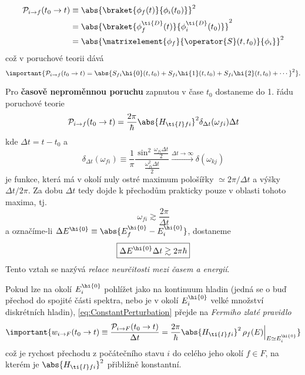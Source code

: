 \begin{align}
    \mathcal{P}_{i\rightarrow f}(t_{0}\rightarrow t)
        &\equiv\abs{\braket{\phi_{f}(t)}{\phi_{i}(t_{0})}}^{2}\nonumber\\
        &=\abs{\braket{\phi_{f}^{\ti{D}}(t)}{\phi_{i}^{\ti{D}}(t_{0})}}^{2}\nonumber\\
        &=\abs{\matrixelement{\phi_{f}}{\operator{S}(t,t_{0})}{\phi_{i}}}^{2}
\end{align}
což v poruchové teorii dává
\begin{equation}
    \important{
        \mathcal{P}_{i\rightarrow f}(t_{0}\rightarrow t)
            =\abs{S_{fi}\hi{0}(t,t_{0})+S_{fi}\hi{1}(t,t_{0})
                +S_{fi}\hi{2}(t,t_{0})+\dotsb}^{2}
    }.
\end{equation}

Pro {\bf časově neproměnnou poruchu} zapnutou v čase $t_{0}$ dostaneme do 1. řádu 
poruchové teorie
\begin{equation}\label{eq:ConstantPerturbation}
    \mathcal{P}_{i\rightarrow f}(t_{0}\rightarrow t)
        =\frac{2\pi}{\hbar}\abs{H_{\ti{I}fi}}^{2}\delta_{\Delta t}(\omega_{fi})\Delta t
\end{equation}
kde $\Delta t=t-t_{0}$ a 
\begin{equation}
    \delta_{\Delta t}(\omega_{fi})
        \equiv\frac{1}{\pi}\frac{\sin^{2}
            \frac{\omega_{fi}\Delta t}{2}}{\frac{\omega^{2}_{fi}\Delta t}{2}}
        \xrightarrow{\Delta t\rightarrow\infty}\delta(\omega_{kj})
\end{equation}
je funkce, která má v okolí nuly ostré maximum pološířky $\simeq2\pi/\Delta t$ 
a výšky $\Delta t/2\pi$.
Za dobu $\Delta t$ tedy dojde k přechodům prakticky pouze v oblasti tohoto maxima, tj.
\begin{equation}
    \omega_{fi}
        \gtrsim\frac{2\pi}{\Delta t}
\end{equation}
a označíme-li $\Delta E^{\hi{0}}\equiv\abs{E^{\hi{0}}_{f}-E^{\hi{0}}_{i}}$, dostaneme
\begin{equation}
    \boxed{\Delta E^{\hi{0}}\Delta t
        \gtrsim2\pi\hbar}
\end{equation}
Tento vztah se nazývá \emph{relace neurčitosti mezi časem a energií}.

Pokud lze na okolí $E_{i}^{\hi{0}}$ pohlížet jako na kontinuum hladin (jedná se o buď přechod do spojité části spektra, nebo je v okolí $E_{i}^{\hi{0}}$ velké množství diskrétních hladin), \eqref{eq:ConstantPerturbation} 
přejde na \emph{Fermiho zlaté pravidlo}
\begin{equation}\label{eq:FermiGoldenRuleConst}
    \important{
        w_{i\rightarrow F}(t_{0}\rightarrow t)
            \equiv\frac{\mathcal{P}_{i\rightarrow F}(t_{0}\rightarrow t)}{\Delta t}
            =\frac{2\pi}{\hbar}\abs{H_{\ti{I}fi}}^{2}\,
                \rho_{f}(E)\Big\vert_{E\simeq E_{i}^{\hi{0}}}
    }
\end{equation}
což je rychost přechodu z počátečního stavu $i$ do celého jeho okolí $f\in F$, 
na kterém je $\abs{H_{\ti{I}fi}}^{2}$ přibližně konstantní.

